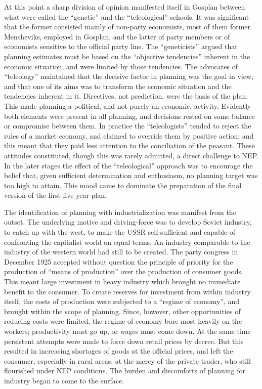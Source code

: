 At this point a sharp division of opinion manifested itself in Gosplan between what were called the ``genetic'' and the ``teleological'' schools. It was significant that the former consisted mainly of non-party economists, most of them former Mensheviks, employed in Gosplan, and the latter of party members or of economists sensitive to the official party line. The ``geneticists'' argued that planning estimates must be based on the ``objective tendencies'' inherent in the economic situation, and were limited by those tendencies. The advocates of ``teleology'' maintained that the decisive factor in planning was the goal in view, and that one of its aims was to transform the economic situation and the tendencies inherent in it. Directives, not prediction, were the basis of the plan. This made planning a political, and not purely an economic, activity. Evidently both elements were present in all planning, and decisions rested on some balance or compromise between them. In practice the ``teleologists'' tended to reject the rules of a market economy, and claimed to override them by positive action; and this meant that they paid less attention to the conciliation of the peasant. These attitudes constituted, though this was rarely admitted, a direct challenge to NEP. In the later stages the effect of the ``teleological'' approach was to encourage the belief that, given sufficient determination and enthusiasm, no planning target was too high to attain. This mood came to dominate the preparation of the final version of the first five-year plan. 

The identification of planning with industrialization was manifest from the outset. The underlying motive and driving-force was to develop Soviet industry, to catch up with the west, to make the USSR self-sufficient and capable of confronting the capitalist world on equal terms. An industry comparable to the industry of the western world had still to be created. The party congress in December 1925 accepted without question the principle of priority for the production of ``means of production'' over the production of consumer goods. This meant large investment in heavy industry which brought no immediate benefit to the consumer. To create reserves for investment from within industry itself, the costs of production were subjected to a ``regime of economy'', and brought within the scope of planning. Since, however, other opportunities of reducing costs were limited, the regime of economy bore most heavily on the workers; productivity must go up, or wages must come down. At the same time persistent attempts were made to force down retail prices by decree. But this resulted in increasing shortages of goods at the official prices, and left the consumer, especially in rural areas, at the mercy of the private trader, who still flourished under NEP conditions. The burden and discomforts of planning for industry began to come to the surface. 

